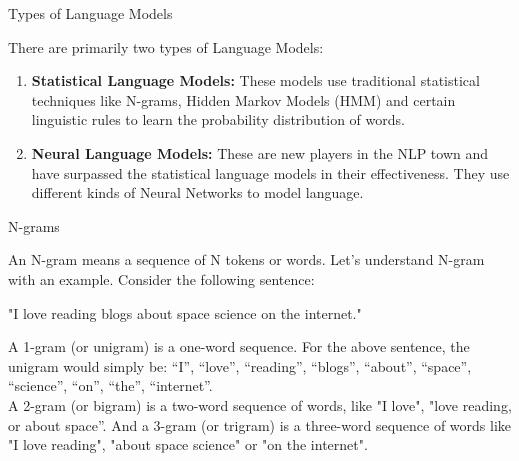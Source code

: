 \documentclass{beamer}
\begin{document}
\begin{frame}{Types of Language Models}
	\begin{flushleft}
		There are primarily two types of Language Models:
		\begin{enumerate}
			\item \textbf{Statistical Language Models:} These models use traditional statistical techniques like N-grams, Hidden Markov Models (HMM) and certain linguistic rules to learn the probability distribution of words.
			\item \textbf{Neural Language Models:} These are new players in the NLP town and have surpassed the statistical language models in their effectiveness. They use different kinds of Neural Networks to model language. 
		\end{enumerate}
	\end{flushleft}
\end{frame}

\begin{frame}{N-grams}
\begin{flushleft}
An N-gram means a sequence of N tokens or words. Let’s understand N-gram with an example. Consider the following sentence:\\
\vspace{10pt}
\end{flushleft}
"I love reading blogs about space science on the internet."\\
\vspace{10pt}
\begin{flushleft}
A 1-gram (or unigram) is a one-word sequence. For the above sentence, the unigram would simply be: “I”, “love”, “reading”, “blogs”, “about”, “space”, “science”, “on”, “the”, “internet”.\\
\vspace{10pt}
A 2-gram (or bigram) is a two-word sequence of words, like "I love", "love reading, or about space”. And a 3-gram (or trigram) is a three-word sequence of words like "I love reading", "about space science" or "on the internet".
\end{flushleft}
\end{frame}
\end{document}
